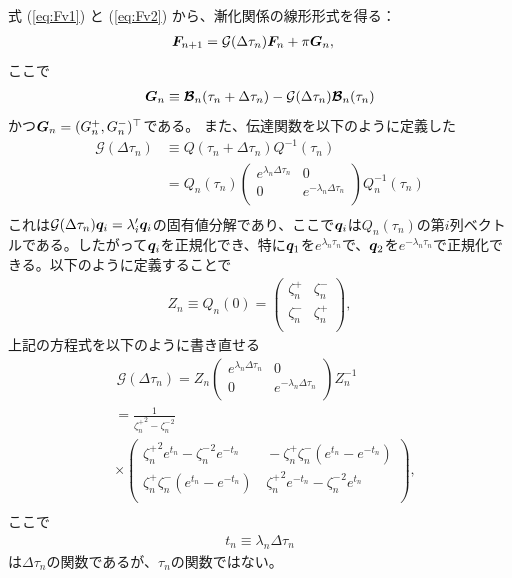 式 (\ref{eq:Fv1}) と (\ref{eq:Fv2}) から、漸化関係の線形形式を得る：
\begin{align}
    \label{eq:rtstandard}
    \boldsymbol{F}_{n+1} &= \mathcal{G} (\Delta \tau_n) \boldsymbol{F}_n + \pi \boldsymbol{G}_n,
\end{align}
ここで
\begin{align}
   \boldsymbol{G}_n \equiv \boldsymbol{\mathcal{B}}_n (\tau_n + \Delta \tau_n) - \mathcal{G} (\Delta \tau_n) \boldsymbol{\mathcal{B}}_n (\tau_n)  
\end{align}
かつ$\boldsymbol{G}_n = (G_n^+, G_n^-)^\top$である。
また、伝達関数を以下のように定義した
\begin{align}
\label{eq:transfer_matrix}
\mathcal{G} (\Delta \tau_n) &\equiv Q(\tau_n + \Delta \tau_n) Q^{-1}(\tau_n) \\
&=  Q_n(\tau_n)
 \left(
\begin{array}{cc}
e^{\lambda_n \Delta \tau_n}  & 0  \\
0 & e^{-\lambda_n \Delta \tau_n}  \\
\end{array}
\right) Q_n^{-1}(\tau_n) \nonumber \\
\end{align}
これは$ \mathcal{G} (\Delta \tau_n) \boldsymbol{q}_i = \lambda^\prime_i \boldsymbol{q}_i$の固有値分解であり、ここで$\boldsymbol{q}_i$は$Q_n(\tau_n)$の第$i$列ベクトルである。したがって$\boldsymbol{q}_i$を正規化でき、特に$\boldsymbol{q}_1$を$e^{\lambda_n \tau_n}$で、$\boldsymbol{q}_2$を$e^{-\lambda_n \tau_n}$で正規化できる。以下のように定義することで
\begin{align}
    Z_n \equiv Q_n(0) = \left(
\begin{array}{cc}
\zeta^+_n  & \zeta^-_n  \\
\zeta^-_n & \zeta^+_n  \\
\end{array}
\right),
\end{align}
上記の方程式を以下のように書き直せる
\begin{align}
\label{eq:transfer_matrix2}
&\,\mathcal{G} (\Delta \tau_n) = 
 Z_n
 \left(
\begin{array}{cc}
e^{\lambda_n \Delta \tau_n}  & 0  \\
0 & e^{-\lambda_n \Delta \tau_n}  \\
\end{array}
\right) Z_n^{-1} \\
\label{eq:gzero}
&= \frac{1}{{\zeta^+_n}^2 - {\zeta^-_n}^2} \nonumber \\
&\times \left(
\begin{array}{cc}
  {\zeta^+_n}^2 e^{t_n} - {\zeta^-_n}^2 e^{-t_n} & \,  - \zeta^+_n \zeta^-_n (e^{t_n} - e^{-t_n}) \\
\zeta^+_n \zeta^-_n (e^{t_n} - e^{-t_n})& \, {\zeta^+_n}^2 e^{-t_n} - {\zeta^-_n}^2 e^{t_n} \\
\end{array}
\right), \nonumber \\
\end{align}
ここで
\begin{align}
t_n \equiv \lambda_n \Delta \tau_n
\end{align}
は$\Delta \tau_n$の関数であるが、$\tau_n$の関数ではない。


